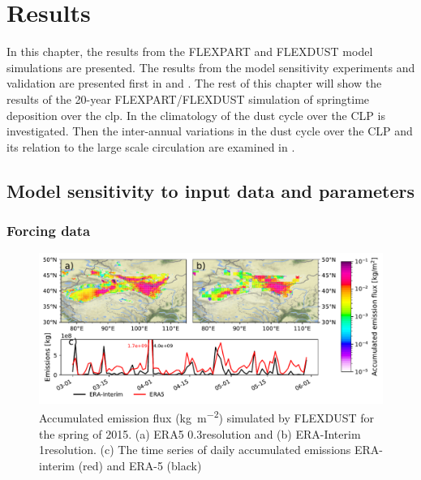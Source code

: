 \chapter{Results}\label{Chap:Results}
In this chapter, the results from the FLEXPART and FLEXDUST model simulations are presented. 
The results from the model sensitivity experiments and validation are presented first in  and . 
The rest of this chapter will show the results of the 20-year FLEXPART/FLEXDUST simulation of springtime deposition over the \acrshort{clp}. 
In  the climatology of the dust cycle over the CLP is investigated.   
Then the inter-annual variations in the dust cycle over the CLP and its relation to the large scale circulation are examined in .


\section{Model sensitivity to input data and parameters}\label{sec:sensitvity_experiment}

\subsection{Forcing data}\label{sec:sens_forcing}

\begin{figure}[htpb]
    \centering
    \includegraphics[width=\textwidth]{texfiles/figs/emissions_ERA5_ERA-interim.pdf}
    \caption{Accumulated emission flux  (\si{\kg\per\square\metre}) simulated by FLEXDUST for the spring of 2015. (a) ERA5 0.3\degree resolution and (b) ERA-Interim 1\degree resolution. (c) The time series of daily accumulated emissions ERA-interim (red) and ERA-5 (black) }
    \label{fig:ERA5_ERA-interim_emissions}
\end{figure}

